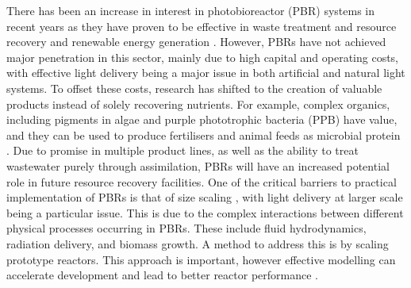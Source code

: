 There has been an increase in interest in photobioreactor (PBR) systems in recent years as they have proven to be effective in waste treatment and resource recovery \cite{Hulsen2016a, Hulsen2016} and renewable energy generation \cite{Adessi2014}. However, PBRs have not achieved major penetration in this sector, mainly due to high capital and operating costs, with effective light delivery being a major issue in both artificial and natural light systems. To offset these costs, research has shifted to the creation of valuable products instead of solely recovering nutrients. For example, complex organics, including pigments in algae \cite{Borowitzka2013} and purple phototrophic bacteria (PPB) have value, and they can be used to produce fertilisers and animal feeds as microbial protein \cite{Matassa2016, Matassa2015}. Due to promise in multiple product lines, as well as the ability to treat wastewater purely through assimilation, PBRs will have an increased potential role in future resource recovery facilities.
\skippingparagraph
One of the critical barriers to practical implementation of PBRs is that of size scaling \cite{AcienFernandez1999}, with light delivery at larger scale being a particular issue. This is due to the complex interactions between different physical processes occurring in PBRs. These include fluid hydrodynamics, radiation delivery, and biomass growth. A method to address this is by scaling prototype reactors. This approach is important, however effective modelling can accelerate development and lead to better reactor performance \cite{Perez-Castro2016}. 
\skippingparagraph
